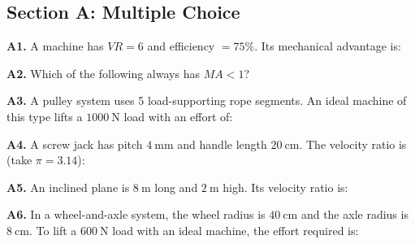 \newpage
\begin{exercisebox}[10]

\subsection*{Section A: Multiple Choice}

\textbf{A1.} A machine has $VR = 6$ and efficiency
$= 75\%$. Its mechanical advantage is:


\vspace{0.4cm}

\textbf{A2.} Which of the following always has
$MA < 1$?


\vspace{0.4cm}

\textbf{A3.} A pulley system uses 5 load-supporting
rope segments. An ideal machine of this type lifts
a $1000\ \text{N}$ load with an effort of:


\vspace{0.4cm}

\textbf{A4.} A screw jack has pitch $4\ \text{mm}$
and handle length $20\ \text{cm}$.
The velocity ratio is (take $\pi = 3.14$):


\vspace{0.4cm}

\textbf{A5.} An inclined plane is $8\ \text{m}$ long
and $2\ \text{m}$ high. Its velocity ratio is:


\vspace{0.4cm}

\textbf{A6.} In a wheel-and-axle system, the wheel
radius is $40\ \text{cm}$ and the axle radius is
$8\ \text{cm}$. To lift a $600\ \text{N}$ load with
an ideal machine, the effort required is:


\end{exercisebox}
